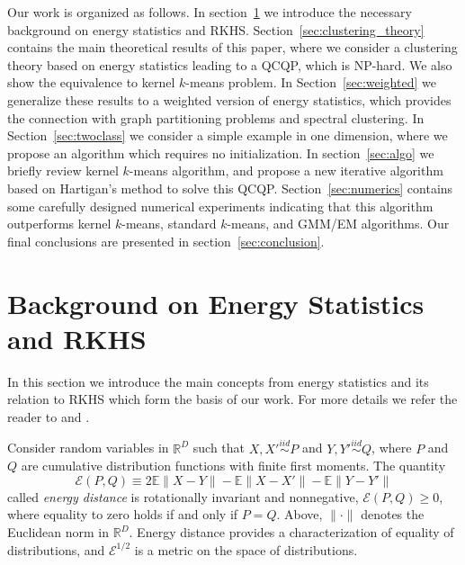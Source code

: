 \documentclass[aps,preprint,nofootinbib,floatfix]{revtex4-1}
\newcommand\Energy{\mathcal{E}}
\newcommand\E{\mathbb{E}}
\begin{document}
Our work is organized as follows. In section~\ref{sec:background} we introduce
the necessary background on energy statistics and RKHS.
Section~\ref{sec:clustering_theory} contains the main theoretical 
results of this paper,
where we consider a clustering theory based on energy statistics leading
to a QCQP, which is NP-hard. We also show the equivalence to 
kernel $k$-means problem.
In Section~\ref{sec:weighted} we generalize these results to a weighted
version of energy statistics, which provides the connection with graph
partitioning problems and spectral clustering.
In Section~\ref{sec:twoclass} we consider a simple example in one dimension,
where we propose an algorithm which requires no initialization.
In section~\ref{sec:algo} we briefly review kernel $k$-means algorithm,
and propose a new iterative algorithm based on Hartigan's method
to solve this QCQP.
Section~\ref{sec:numerics} contains some carefully designed numerical
experiments indicating that this algorithm outperforms kernel
$k$-means, standard $k$-means, and GMM/EM algorithms.
Our final conclusions are presented in section~\ref{sec:conclusion}.


\section{Background on Energy Statistics and RKHS}
\label{sec:background}

In this section we introduce the main concepts from energy
statistics and its relation to 
RKHS which form the basis of our work.
For more details we refer the reader
to \cite{Szkely2013} and \cite{Sejdinovic2013}.

Consider random variables in $\mathbb{R}^D$ 
such that $X,X' \stackrel{iid}{\sim} P$ and 
$Y,Y' \stackrel{iid}{\sim} Q$, where $P$ and $Q$ are cumulative
distribution functions with finite first moments. 
The quantity 
\begin{equation}
\label{eq:energy}
\Energy(P, Q) \equiv 2 \E \| X - Y\| - \E \| X - X' \| - \E \| Y - Y' \|
\end{equation}
called \emph{energy distance} \cite{Szkely2013} 
is rotationally invariant and nonnegative, $\Energy(P,Q) \ge 0$, where
equality
to zero holds if and only if $P = Q$.
Above, $\| \cdot \|$ denotes the
Euclidean norm in $\mathbb{R}^D$. 
Energy distance
provides a characterization of equality of distributions, and
$\Energy^{1/2}$ is
a metric on the space of distributions.
\end{document}
